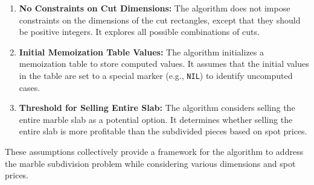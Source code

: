 \documentclass{article}
\begin{document}
\begin{enumerate}
    \item \textbf{No Constraints on Cut Dimensions:} The algorithm does not impose constraints on the dimensions of the cut rectangles, except that they should be positive integers. It explores all possible combinations of cuts.

    \item \textbf{Initial Memoization Table Values:} The algorithm initializes a memoization table to store computed values. It assumes that the initial values in the table are set to a special marker (e.g., \texttt{NIL}) to identify uncomputed cases.

    \item \textbf{Threshold for Selling Entire Slab:} The algorithm considers selling the entire marble slab as a potential option. It determines whether selling the entire slab is more profitable than the subdivided pieces based on spot prices.

\end{enumerate}

These assumptions collectively provide a framework for the algorithm to address the marble subdivision problem while considering various dimensions and spot prices.
\end{document}
